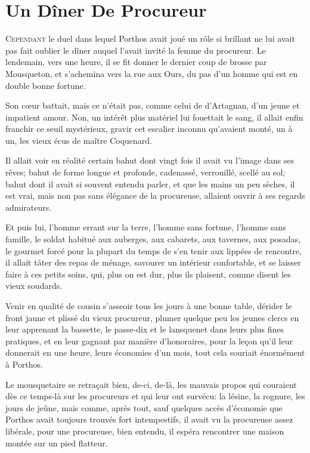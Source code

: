
\chapter{Un Dîner De Procureur}

\lettrine{C}{ependant} le duel dans lequel Porthos avait joué un rôle si brillant ne lui avait pas fait oublier le dîner auquel l'avait invité la femme du procureur. Le lendemain, vers une heure, il se fit donner le dernier coup de brosse par Mousqueton, et s'achemina vers la rue aux Ours, du pas d'un homme qui est en double bonne fortune. 

Son cœur battait, mais ce n'était pas, comme celui de d'Artagnan, d'un jeune et impatient amour. Non, un intérêt plus matériel lui fouettait le sang, il allait enfin franchir ce seuil mystérieux, gravir cet escalier inconnu qu'avaient monté, un à un, les vieux écus de maître Coquenard. 

Il allait voir en réalité certain bahut dont vingt fois il avait vu l'image dans ses rêves; bahut de forme longue et profonde, cadenassé, verrouillé, scellé au sol; bahut dont il avait si souvent entendu parler, et que les mains un peu sèches, il est vrai, mais non pas sans élégance de la procureuse, allaient ouvrir à ses regards admirateurs. 

Et puis lui, l'homme errant sur la terre, l'homme sans fortune, l'homme sans famille, le soldat habitué aux auberges, aux cabarets, aux tavernes, aux posadas, le gourmet forcé pour la plupart du temps de s'en tenir aux lippées de rencontre, il allait tâter des repas de ménage, savourer un intérieur confortable, et se laisser faire à ces petits soins, qui, plus on est dur, plus ils plaisent, comme disent les vieux soudards. 

Venir en qualité de cousin s'asseoir tous les jours à une bonne table, dérider le front jaune et plissé du vieux procureur, plumer quelque peu les jeunes clercs en leur apprenant la bassette, le passe-dix et le lansquenet dans leurs plus fines pratiques, et en leur gagnant par manière d'honoraires, pour la leçon qu'il leur donnerait en une heure, leurs économies d'un mois, tout cela souriait énormément à Porthos. 

Le mousquetaire se retraçait bien, de-ci, de-là, les mauvais propos qui couraient dès ce temps-là sur les procureurs et qui leur ont survécu: la lésine, la rognure, les jours de jeûne, mais comme, après tout, sauf quelques accès d'économie que Porthos avait toujours trouvés fort intempestifs, il avait vu la procureuse assez libérale, pour une procureuse, bien entendu, il espéra rencontrer une maison montée sur un pied flatteur. 

